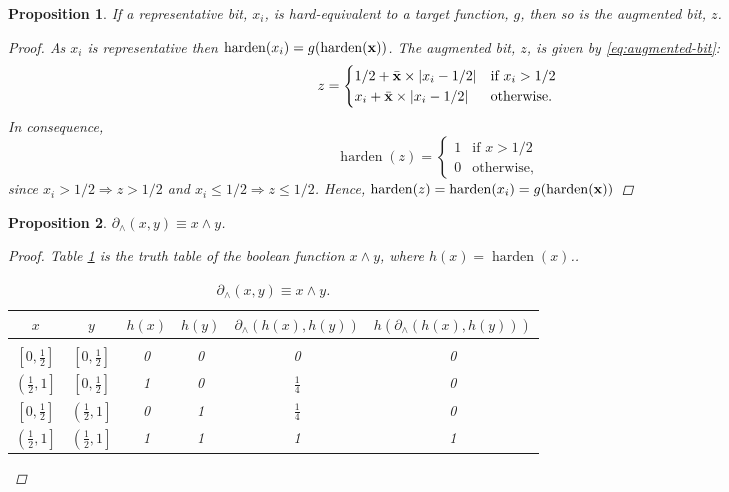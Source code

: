 \documentclass{article} %
\newtheorem{prop}{Proposition}
\begin{document}
\begin{prop}\label{prop:augmented}
	If a representative bit, $x_{i}$, is hard-equivalent to a target function, $g$, then so is the augmented bit, $z$.
	\begin{proof}
		As $x_{i}$ is representative then $\operatorname{harden}(x_{i}) = g(\operatorname{harden}({\bf x}))$. The augmented bit, $z$, is given by  \eqref{eq:augmented-bit}:
		\begin{equation*}
		z = \begin{cases}
		1/2 + \bar{\bf x}\times|x_{i} - 1/2| & \text{if } x_{i} > 1/2 \\
		x_{i} + \bar{\bf x}\times|x_{i} - 1/2| & \text{otherwise.}
		\end{cases}
		\end{equation*}
		In consequence,
		\begin{equation*}
		\operatorname{harden}(z) = \begin{cases}
		1 & \text{if } x > 1/2 \\
		0 & \text{otherwise,}
		\end{cases}
		\end{equation*}
		since $x_{i} > 1/2 \Rightarrow z > 1/2$ and $x_{i} \leq 1/2 \Rightarrow z \leq 1/2$. Hence, $\operatorname{harden}(z) = \operatorname{harden}(x_{i}) = g(\operatorname{harden}({\bf x}))$
	\end{proof}
\end{prop}


\begin{prop}\label{prop:and}
	$\partial_{\wedge}\!(x,y) \equiv x \wedge y$.
\begin{proof}
	Table \ref{and-table} is the truth table of the boolean function $x \wedge y$, where $h(x) = \operatorname{harden}(x)$..
	\begin{table}
		\begin{center}
			\begin{tabular}{cccccc}
				\multicolumn{1}{c}{$x$}  &\multicolumn{1}{c}{$y$}  &\multicolumn{1}{c}{$h(x)$}  &\multicolumn{1}{c}{$h(y)$} &\multicolumn{1}{c}{$\partial_{\wedge}(h(x), h(y))$} &\multicolumn{1}{c}{$h(\partial_{\wedge}(h(x), h(y)))$}
				\\ \hline \\
				$\left[0, \frac{1}{2}\right]$ & $\left[0, \frac{1}{2}\right]$ & 0 & 0 & 0 & 0\\[0.1cm]
				$\left(\frac{1}{2}, 1\right]$ & $\left[0, \frac{1}{2}\right]$ &1 & 0 & $\frac{1}{4}$ & 0\\[0.1cm]
				$\left[0, \frac{1}{2}\right]$ & $\left(\frac{1}{2}, 1\right]$ &0 & 1 & $\frac{1}{4}$ & 0\\[0.1cm]
				$\left(\frac{1}{2}, 1\right]$ & $\left(\frac{1}{2}, 1\right]$ &1 & 1 & 1 & 1\\[0.1cm]
			\end{tabular}
		\end{center}
		\caption{$\partial_{\wedge}(x,y) \equiv x \wedge y$.}\label{and-table}
	\end{table}			
\end{proof}
\end{prop}
\end{document}
